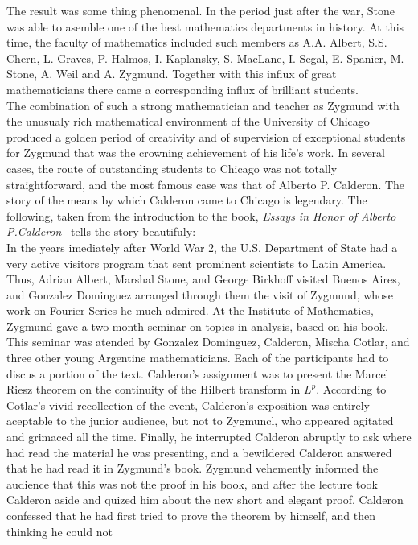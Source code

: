 The result was some thing phenomenal. In the period just after the war, Stone was able to asemble one of the 
best mathematics departments in history. At this time, the faculty of mathematics included such members as A.A. Albert, 
S.S. Chern, L. Graves, P. Halmos, I. Kaplansky, S. MacLane, I. Segal, E. Spanier, M. Stone, A. Weil and A. Zygmund. 
Together with this influx of great mathematicians there came a corresponding influx of brilliant students.\\
\indent The combination of such a strong mathematician and teacher as Zygmund with the unusualy rich mathematical 
environment of the University of Chicago produced a golden period of creativity and of supervision of exceptional 
students for Zygmund that was the crowning achievement of his life's work. In several cases, the route of 
outstanding students to Chicago was not totally straightforward, and the most famous case was that of Alberto P. Calderon. 
The story of the means by which Calderon came to Chicago is legendary. The following, taken from the introduction 
to the book, \textit{Essays in Honor of Alberto P.Calderon}~\cite{albertohonor} tells the story beautifuly:\\
\noindent In the years imediately after World War 2, the U.S. Department of State had a very active visitors 
program that sent prominent scientists to Latin America. Thus, Adrian Albert, Marshal Stone, and George Birkhoff 
visited Buenos Aires, and Gonzalez Dominguez arranged through them the visit of Zygmund, whose work on Fourier Series 
he much admired. At the Institute of Mathematics, Zygmund gave a two-month seminar on topics in analysis, 
based on his book. This seminar was atended by Gonzalez Dominguez, Calderon, Mischa Cotlar, and three other 
young Argentine mathematicians. Each of the participants had to discus a portion of the text. Calderon's 
assignment was to present the Marcel Riesz theorem on the continuity of the Hilbert transform in $L^p$. 
According to Cotlar's vivid recollection of the event, Calderon's exposition was entirely aceptable to the 
junior audience, but not to Zygmuncl, who appeared agitated and grimaced all the time. Finally, he interrupted 
Calderon abruptly to ask where had read the material he was presenting, and a bewildered Calderon answered 
that he had read it in Zygmund's book. Zygmund vehemently informed the audience that this was not the proof 
in his book, and after the lecture took Calderon aside and quized him about the new short and elegant proof. 
Calderon confessed that he had first tried to prove the theorem by himself, and then thinking he could not 
